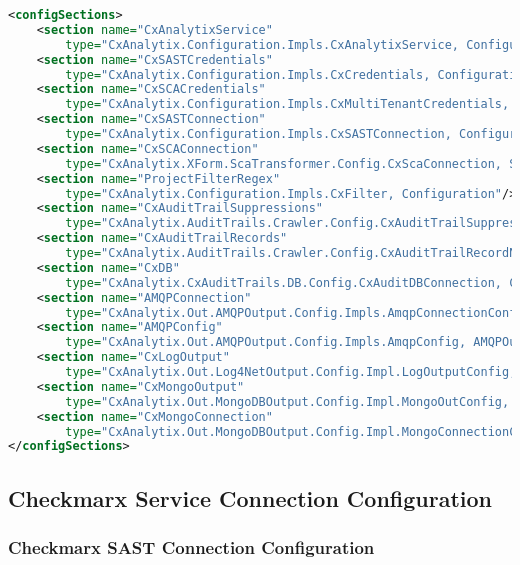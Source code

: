 \begin{lstlisting}[caption={Part of the Configuration File to Never Change}, label={lst:motouch}, language=XML, basicstyle=\ttfamily\tiny]
<configSections>
    <section name="CxAnalytixService" 
        type="CxAnalytix.Configuration.Impls.CxAnalytixService, Configuration" />
    <section name="CxSASTCredentials" 
        type="CxAnalytix.Configuration.Impls.CxCredentials, Configuration" />
    <section name="CxSCACredentials" 
        type="CxAnalytix.Configuration.Impls.CxMultiTenantCredentials, Configuration" />
    <section name="CxSASTConnection" 
        type="CxAnalytix.Configuration.Impls.CxSASTConnection, Configuration" />
    <section name="CxSCAConnection" 
        type="CxAnalytix.XForm.ScaTransformer.Config.CxScaConnection, ScaTransformer" />
    <section name="ProjectFilterRegex" 
        type="CxAnalytix.Configuration.Impls.CxFilter, Configuration"/>
    <section name="CxAuditTrailSuppressions" 
        type="CxAnalytix.AuditTrails.Crawler.Config.CxAuditTrailSuppressions, CxAuditTrailsCrawler"/>
    <section name="CxAuditTrailRecords" 
        type="CxAnalytix.AuditTrails.Crawler.Config.CxAuditTrailRecordNameMap, CxAuditTrailsCrawler"/>
    <section name="CxDB" 
        type="CxAnalytix.CxAuditTrails.DB.Config.CxAuditDBConnection, CxAuditTrailsDB"/>
    <section name="AMQPConnection" 
        type="CxAnalytix.Out.AMQPOutput.Config.Impls.AmqpConnectionConfig, AMQPOutput"/>
    <section name="AMQPConfig" 
        type="CxAnalytix.Out.AMQPOutput.Config.Impls.AmqpConfig, AMQPOutput"/>
    <section name="CxLogOutput" 
        type="CxAnalytix.Out.Log4NetOutput.Config.Impl.LogOutputConfig, Log4NetOutput" />
    <section name="CxMongoOutput" 
        type="CxAnalytix.Out.MongoDBOutput.Config.Impl.MongoOutConfig, MongoDBOutput" />
    <section name="CxMongoConnection" 
        type="CxAnalytix.Out.MongoDBOutput.Config.Impl.MongoConnectionConfig, MongoDBOutput" />
</configSections>
\end{lstlisting}


\subsection{Checkmarx Service Connection Configuration}

\subsubsection{Checkmarx SAST Connection Configuration}


